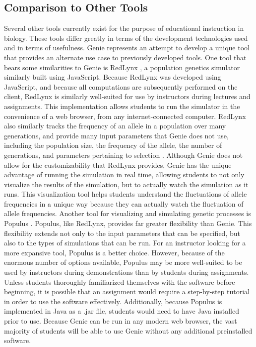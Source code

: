 \documentclass[12pt]{article}
\begin{document}
\begin{spacing}{1.6}
\subsection{Comparison to Other Tools}
Several other tools currently exist for the purpose of educational instruction in biology. These tools differ greatly in terms of the development technologies used and in terms of usefulness. Genie represents an attempt to develop a unique tool that provides an alternate use case to previously developed tools. One tool that bears some similarities to Genie is RedLynx \cite{redlynx}, a population genetics simulator similarly built using JavaScript. Because RedLynx was developed using JavaScript, and because all computations are subsequently performed on the client, RedLynx is similarly well-suited for use by instructors during lectures and assignments. This implementation allows students to run the simulator in the convenience of a web browser, from any internet-connected computer. RedLynx also similarly tracks the frequency of an allele in a population over many generations, and provide many input parameters that Genie does not use, including the population size, the frequency of the allele, the number of generations, and parameters pertaining to selection \cite{redlynx}. Although Genie does not allow for the customizability that RedLynx provides, Genie has the unique advantage of running the simulation in real time, allowing students to not only visualize the results of the simulation, but to actually watch the simulation as it runs. This visualization tool helps students understand the fluctuations of allele frequencies in a unique way because they can actually watch the fluctuation of allele frequencies.\newline
\newline
Another tool for visualizing and simulating genetic processes is Populus \cite{populus}. Populus, like RedLynx, provides far greater flexibility than Genie. This flexibility extends not only to the input parameters that can be specified, but also to the types of simulations that can be run. For an instructor looking for a more expansive tool, Populus is a better choice. However, because of the enormous number of options available, Populus may be more well-suited to be used by instructors during demonstrations than by students during assignments. Unless students thoroughly familiarized themselves with the software before beginning, it is possible that an assignment would require a step-by-step tutorial in order to use the software effectively. Additionally, because Populus is implemented in Java as a .jar file, students would need to have Java installed prior to use. Because Genie can be run in any modern web browser, the vast majority of students will be able to use Genie without any additional preinstalled software.\newline

\end{spacing}
\end{document}
